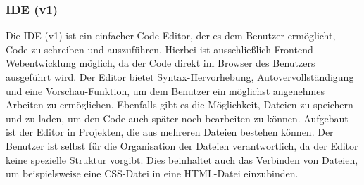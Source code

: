 \documentclass[main.tex]{subfiles}
\begin{document}
    \subsubsection{IDE (v1)}
    Die IDE (v1) ist ein einfacher Code-Editor, der es dem Benutzer ermöglicht, Code zu schreiben und auszuführen.
    Hierbei ist ausschließlich Frontend-Webentwicklung möglich, da der Code direkt im Browser des Benutzers ausgeführt wird.
    Der Editor bietet Syntax-Hervorhebung, Autovervollständigung und eine Vorschau-Funktion, um dem Benutzer ein möglichst angenehmes Arbeiten zu ermöglichen.
    Ebenfalls gibt es die Möglichkeit, Dateien zu speichern und zu laden, um den Code auch später noch bearbeiten zu können.
    Aufgebaut ist der Editor in Projekten, die aus mehreren Dateien bestehen können.
    Der Benutzer ist selbst für die Organisation der Dateien verantwortlich, da der Editor keine spezielle Struktur vorgibt.
    Dies beinhaltet auch das Verbinden von Dateien, um beispielsweise eine CSS-Datei in eine HTML-Datei einzubinden.
\end{document}
